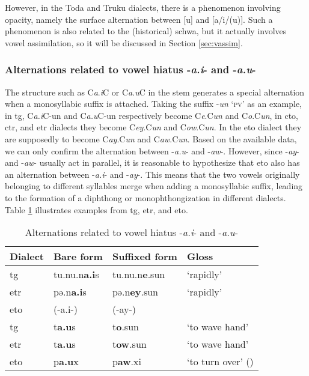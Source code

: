 However, in the Toda and Truku dialects, there is a phenomenon involving opacity, namely the surface alternation between [u] and [a/i/(u)]. Such a phenomenon is also related to the (historical) schwa, but it actually involves vowel assimilation, so it will be discussed in Section \ref{sec:vassim}.

\subsubsection{Alternations related to vowel hiatus -\textit{a.i}- and -\textit{a.u}-} \label{sec:sed_ai_au}

The structure such as C\textit{a}.\textit{i}C or C\textit{a}.\textit{u}C in the stem generates a special alternation when a monosyllabic suffix is attached. Taking the suffix -\textit{un} `\textsc{pv}' as an example, in \acl{tg}, C\textit{a.i}C-un and C\textit{a.u}C-un respectively become C\textit{e}.C\textit{un} and C\textit{o}.C\textit{un}, in \acl{cto}, \acl{ctr}, and \acl{etr} dialects they become C\textit{ey}.C\textit{un} and C\textit{ow}.C\textit{un}. In the \acl{eto} dialect they 
are supposedly to become C\textit{ay}.C\textit{un} and C\textit{aw}.C\textit{un}. Based on the available data, we can only confirm the alternation between -\textit{a.u}- and -\textit{aw}-. However, since -\textit{ay}- and -\textit{aw}- usually act in parallel, it is reasonable to hypothesize that \acl{eto} also has an alternation between -\textit{a.i}- and -\textit{ay}-. This means that the two vowels originally belonging to different syllables merge when adding a monosyllabic suffix, leading to the formation of a diphthong or monophthongization in different dialects. Table \ref{tab:aiau_alt} illustrates examples from \acl{tg}, \acl{etr}, and \acl{eto}.

\begin{table}[!htbp]
\centering
\caption{Alternations related to vowel hiatus -\textit{a.i}- and -\textit{a.u}-}
\label{tab:aiau_alt}
\begin{tabular}{llll}
\hline
Dialect   & Bare form   & Suffixed form & Gloss                           \\ \hline
\acl{tg}  & tu.nu.n\textbf{a.i}s & tu.nu.n\textbf{e}.sun  & `rapidly'      \\
\acl{etr} & pə.n\textbf{a.i}s    & pə.n\textbf{ey}.sun    & `rapidly'                       \\
\acl{eto} & (-a.i-)   & (-ay-)    &                                \\ 
\hdashline
\acl{tg}  & t\textbf{a.u}s       & t\textbf{o}.sun        & `to wave hand' \\
\acl{etr} & t\textbf{a.u}s       & t\textbf{ow}.sun       & `to wave hand' \\
\acl{eto} & p\textbf{a.u}x       & p\textbf{aw}.xi        & `to turn over' (\cite[98]{lee2015tawsa})\\ \hline
\end{tabular}
\end{table}

